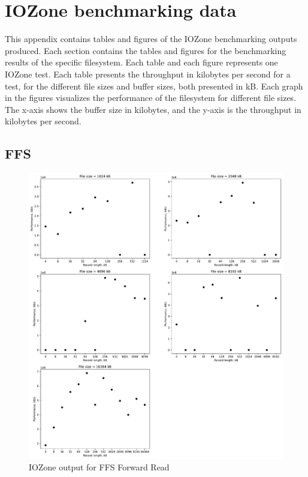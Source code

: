 \chapter{IOZone benchmarking data}
\label{app:bench_data}

This appendix contains tables and figures of the IOZone benchmarking outputs produced. Each section contains the tables and figures for the benchmarking results of the specific filesystem. Each table and each figure represents one IOZone test. Each table presents the throughput in kilobytes per second for a test, for the different file sizes and buffer sizes, both presented in kB. Each graph in the figures visualizes the performance of the filesystem for different file sizes. The \mbox{x-axis} shows the buffer size in kilobytes, and the \mbox{y-axis} is the throughput in kilobytes per second.

\section{FFS}








\begin{figure}[!htb]
	\label{fig:app_bench_ffs_read}
	\begin{center}
		\includegraphics[width=1.0\textwidth]{figures/benchmarking/ffs/Read.pdf}
	\end{center}
	\caption{IOZone output for FFS Forward Read}
\end{figure}

